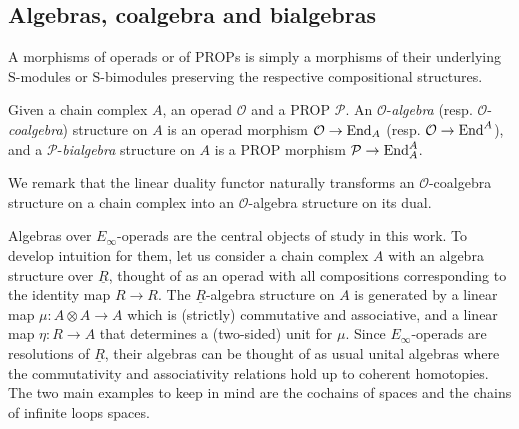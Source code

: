 \subsection{Algebras, coalgebra and bialgebras}

A morphisms of operads or of PROPs is simply a morphisms of their underlying $\mathrm{S}$-modules or $\mathrm{S}$-bimodules preserving the respective compositional structures.

Given a chain complex $A$, an operad $\mathcal O$ and a PROP $\mathcal P$. An $\mathcal O$-\textit{algebra} (resp. $\mathcal O$-\textit{coalgebra}) structure on $A$ is an operad morphism $\mathcal O \to \mathrm{End}_A$ (resp. $\mathcal O \to \mathrm{End}^A$), and a $\mathcal P$-\textit{bialgebra} structure on $A$ is a PROP morphism $\mathcal P \to \mathrm{End}_A^A$.

We remark that the linear duality functor naturally transforms an $\mathcal O$-coalgebra structure on a chain complex into an $\mathcal O$-algebra structure on its dual.

Algebras over $E_\infty$-operads are the central objects of study in this work. To develop intuition for them, let us consider a chain complex $A$ with an algebra structure over $\underline{R}$, thought of as an operad with all compositions corresponding to the identity map $R \to R$. The $\underline{R}$-algebra structure on $A$ is generated by a linear map $\mu \colon A \otimes A \to A$ which is (strictly) commutative and associative, and a linear map $\eta \colon R \to A$ that determines a (two-sided) unit for $\mu$. Since $E_\infty$-operads are resolutions of $\underline{R}$, their algebras can be thought of as usual unital algebras where the commutativity and associativity relations hold up to coherent homotopies. The two main examples to keep in mind are the cochains of spaces and the chains of infinite loops spaces.	

